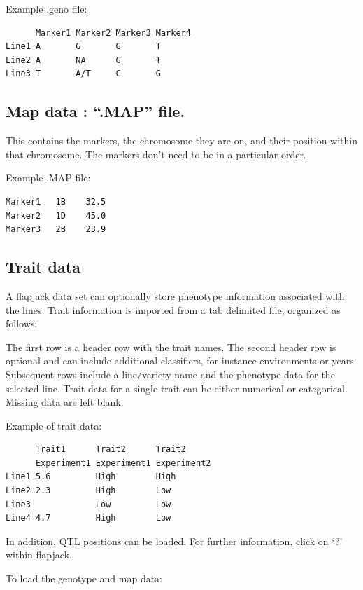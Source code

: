 \documentclass[
]{book}
\begin{document}
Example .geno file:

\begin{verbatim}
      Marker1 Marker2 Marker3 Marker4
Line1 A       G       G       T
Line2 A       NA      G       T
Line3 T       A/T     C       G
\end{verbatim}

\hypertarget{map-data-.map-file.}{%
\subsection{Map data : ``.MAP'' file.}\label{map-data-.map-file.}}

This contains the markers, the chromosome they are on, and their position within that chromosome. The markers don't need to be in a particular order.

Example .MAP file:

\begin{verbatim}
Marker1   1B    32.5
Marker2   1D    45.0
Marker3   2B    23.9
\end{verbatim}

\hypertarget{trait-data}{%
\subsection{Trait data}\label{trait-data}}

A flapjack data set can optionally store phenotype information associated with the lines. Trait information is imported from a tab delimited file, organized as follows:

The first row is a header row with the trait names. The second header row is optional and can include additional classifiers, for instance environments or years. Subsequent rows include a line/variety name and the phenotype data for the selected line. Trait data for a single trait can be either numerical or categorical. Missing data are left blank.

Example of trait data:

\begin{verbatim}
      Trait1      Trait2      Trait2
      Experiment1 Experiment1 Experiment2
Line1 5.6         High        High
Line2 2.3         High        Low
Line3             Low         Low
Line4 4.7         High        Low
\end{verbatim}

In addition, QTL positions can be loaded. For further information, click on `?' within flapjack.

To load the genotype and map data:
\end{document}

